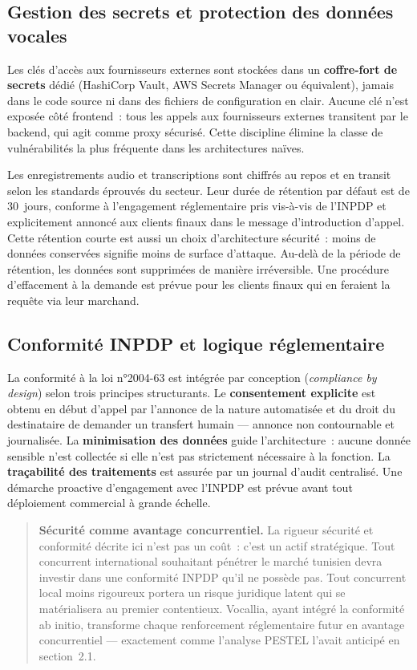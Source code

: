 \subsection{Gestion des secrets et protection des données vocales}
\label{subsec:donnees_secrets_vocal}

Les clés d'accès aux fournisseurs externes sont stockées dans un \textbf{coffre-fort de secrets} dédié (HashiCorp Vault, AWS Secrets Manager ou équivalent), jamais dans le code source ni dans des fichiers de configuration en clair. Aucune clé n'est exposée côté frontend~: tous les appels aux fournisseurs externes transitent par le backend, qui agit comme proxy sécurisé. Cette discipline élimine la classe de vulnérabilités la plus fréquente dans les architectures naïves.

Les enregistrements audio et transcriptions sont chiffrés au repos et en transit selon les standards éprouvés du secteur. Leur durée de rétention par défaut est de 30~jours, conforme à l'engagement réglementaire pris vis-à-vis de l'INPDP et explicitement annoncé aux clients finaux dans le message d'introduction d'appel. Cette rétention courte est aussi un choix d'architecture sécurité~: moins de données conservées signifie moins de surface d'attaque. Au-delà de la période de rétention, les données sont supprimées de manière irréversible. Une procédure d'effacement à la demande est prévue pour les clients finaux qui en feraient la requête via leur marchand.

\subsection{Conformité INPDP et logique réglementaire}
\label{subsec:donnees_inpdp}

La conformité à la loi n°2004-63 est intégrée par conception (\emph{compliance by design}) selon trois principes structurants. Le \textbf{consentement explicite} est obtenu en début d'appel par l'annonce de la nature automatisée et du droit du destinataire de demander un transfert humain — annonce non contournable et journalisée. La \textbf{minimisation des données} guide l'architecture~: aucune donnée sensible n'est collectée si elle n'est pas strictement nécessaire à la fonction. La \textbf{traçabilité des traitements} est assurée par un journal d'audit centralisé. Une démarche proactive d'engagement avec l'INPDP est prévue avant tout déploiement commercial à grande échelle.

\begin{quote}
\textbf{Sécurité comme avantage concurrentiel.} La rigueur sécurité et conformité décrite ici n'est pas un coût~: c'est un actif stratégique. Tout concurrent international souhaitant pénétrer le marché tunisien devra investir dans une conformité INPDP qu'il ne possède pas. Tout concurrent local moins rigoureux portera un risque juridique latent qui se matérialisera au premier contentieux. Vocallia, ayant intégré la conformité ab initio, transforme chaque renforcement réglementaire futur en avantage concurrentiel — exactement comme l'analyse PESTEL l'avait anticipé en section~2.1.
\end{quote}

